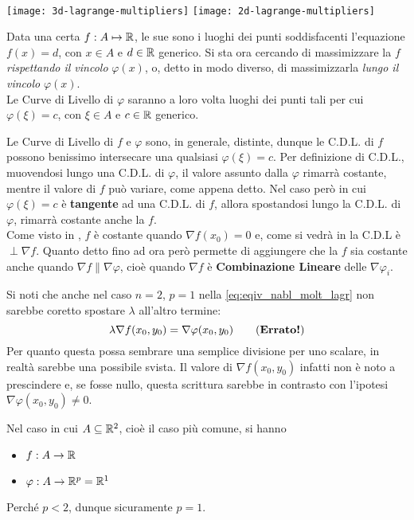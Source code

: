 \newpage %
\begin{observation}~
	\label{obs:concetto_teo_molt_lagr_gen}
	\begin{center}
		\texttt{[image: 3d-lagrange-multipliers]}
		\texttt{[image: 2d-lagrange-multipliers]}
	\end{center}
	Data una certa $f: A \mapsto \mathbb{R}$, le sue  sono i luoghi dei punti soddisfacenti l'equazione $f(x) = d$, con $x \in A$ e $d \in \mathbb{R}$ generico. Si sta ora cercando di massimizzare la $f$ \textit{rispettando il vincolo} $\varphi(x)$, o, detto in modo diverso, di massimizzarla \textit{lungo il vincolo} $\varphi(x)$.\\
	Le Curve di Livello di $\varphi$ saranno a loro volta luoghi dei punti tali per cui $\varphi(\xi) = c$, con $\xi \in A$ e $c \in \mathbb{R}$ generico.

	Le Curve di Livello di $f$ e $\varphi$ sono, in generale, distinte, dunque le C.D.L. di $f$ possono benissimo intersecare una qualsiasi $\varphi(\xi) = c$. Per definizione di C.D.L., muovendosi lungo una C.D.L. di $\varphi$, il valore assunto dalla $\varphi$ rimarrà costante, mentre il valore di $f$ può variare, come appena detto. Nel caso però in cui $\varphi(\xi) = c$ è \textbf{tangente} ad una C.D.L. di $f$, allora spostandosi lungo la C.D.L. di $\varphi$, rimarrà costante anche la $f$.\\
	Come visto in , $f$ è costante quando $\nabla f(x_0) = 0$ e, come si vedrà in  la C.D.L è $\perp \nabla f$. Quanto detto fino ad ora però permette di aggiungere che la $f$ sia costante anche quando $\nabla f \parallel \nabla \varphi$, cioè quando $\nabla f$ è \textbf{Combinazione Lineare} delle $\nabla \varphi_i$.
\end{observation}
\begin{observation}
	Si noti che anche nel caso $n = 2$, $p = 1$ nella \cref{eq:eqiv_nabl_molt_lagr} non sarebbe coretto spostare $\lambda$ all'altro termine:
	\[\lambda \nabla f(x_0, y_0) = \nabla \varphi (x_0, y_0) \tag{\textbf{Errato!}}\]
	Per quanto questa possa sembrare una semplice divisione per uno scalare, in realtà sarebbe una possibile svista. Il valore di $\nabla f(x_0,y_0)$ infatti non è noto a prescindere e, se fosse nullo, questa scrittura sarebbe in contrasto con l'ipotesi $\nabla \varphi(x_0,y_0) \neq 0$.
\end{observation}
\begin{example}
	\label{ex:max_min_vinc_n2_p1}
	Nel caso in cui $A \subseteq \mathbb{R}^2$, cioè il caso più comune, si hanno
	\begin{itemize}[noitemsep]
		\item $f: A \to \mathbb{R}$
		\item $\varphi: A \to \mathbb{R}^p = \mathbb{R}^1$
	\end{itemize}
	Perché $p < 2$, dunque sicuramente $p = 1$.
\end{example}


